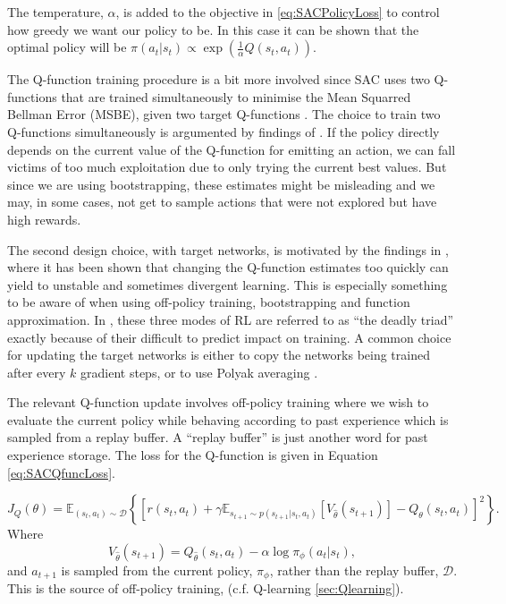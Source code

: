 \documentclass{report}
\numberwithin{equation}{section}
\numberwithin{figure}{section}
\numberwithin{table}{section}
\numberwithin{algorithm}{section}
\begin{document}
The temperature, $\alpha$, is added to the objective in 
\ref{eq:SACPolicyLoss} to control how greedy we want our policy 
to be. In this case it can be shown that the optimal policy 
will be $\pi(a_t|s_t)\propto\exp\left(\frac{1}{\alpha}Q(s_t,a_t)\right)$.

The Q-function training procedure is a bit more involved 
since SAC uses two Q-functions \citep{HasseltDoubleQlearning} 
that are trained simultaneously to 
minimise the Mean Squarred Bellman Error (MSBE), given two 
target Q-functions \citep{DQN}. The choice to train 
two Q-functions simultaneously 
is argumented by findings of \cite{HasseltDoubleQlearning}. 
If the policy directly depends on the current 
value of the Q-function for emitting an action, we can fall 
victims of too much exploitation due to only trying the current 
best values. But since we are using bootstrapping, these 
estimates might be misleading and we may, in some cases, not 
get to sample actions that were not explored but have 
high rewards.

The second design choice, with target networks, 
is motivated by the findings in \cite{DQN}, 
where it has been shown that changing the Q-function estimates 
too quickly can yield to unstable and sometimes divergent learning. 
This is especially something to be aware of when using 
off-policy training, bootstrapping and function approximation.
In \cite{Sutton1998}, these three modes of RL are referred to 
as ``the deadly triad'' exactly because of their difficult 
to predict impact on training. A common choice for updating the 
target networks is either to copy the networks being trained 
after every $k$ gradient steps, or to use Polyak averaging 
\citep{PolyakAvg}.

The relevant Q-function update involves off-policy training 
where we wish to evaluate the current policy while behaving 
according to past experience which is sampled from a replay buffer. 
A ``replay buffer'' is just another word for past experience 
storage. The loss for the Q-function is given in Equation 
\ref{eq:SACQfuncLoss}.

\begin{equation}\label{eq:SACQfuncLoss}
  J_Q(\theta)=\mathbb{E}_{(s_t,a_t)\sim \mathcal{D}}\left\{\left[
    r(s_t, a_t) 
    + \gamma \mathbb{E}_{s_{t+1}\sim p(s_{t+1}|s_t, a_t)}[V_{\hat{\theta}}(s_{t+1})]
    - Q_\theta(s_t,a_t)
  \right]^2\right\}.
\end{equation}
Where 
\begin{equation*}
  V_{\hat{\theta}}(s_{t+1})=Q_{\hat{\theta}}(s_t,a_t) - \alpha \log \pi_\phi(a_t|s_t),
\end{equation*}
and $a_{t+1}$ is sampled from the current policy, $\pi_\phi$, rather 
than the replay buffer, $\mathcal{D}$. This is the source of off-policy 
training, (c.f. Q-learning \ref{sec:Qlearning}).
\end{document}
